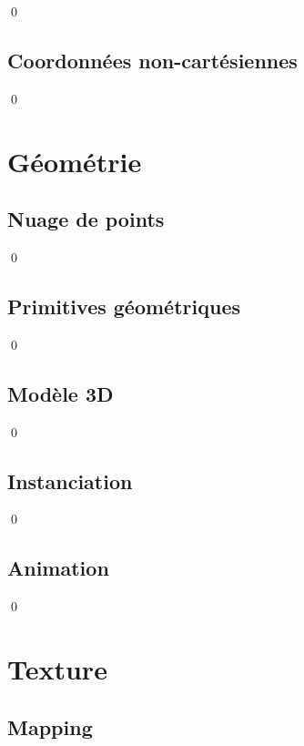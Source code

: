\documentclass[12pt]{article}
\newcommand{\state}{\noindent}
\begin{document}
\qed

\subsection{Coordonnées non-cartésiennes}

\state

\qed


\pagebreak

\section{Géométrie}

\subsection{Nuage de points}

\state

\qed

\subsection{Primitives géométriques}

\state

\qed

\subsection{Modèle 3D}

\state

\qed

\subsection{Instanciation}

\state

\qed

\subsection{Animation}

\state

\qed

\pagebreak

\section{Texture}

\subsection{Mapping}
\end{document}

